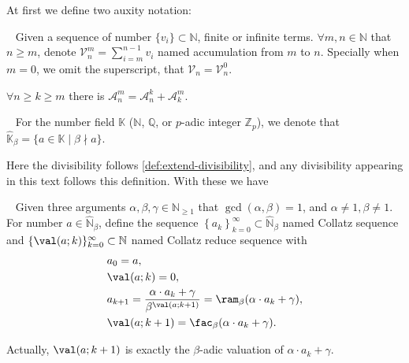 At first we define two auxity notation:
\begin{definition}~\label{def:collatz-accumulation}
    Given a sequence of number $\{v_{i}\}\subset\mathbb{N}$, finite or infinite terms. $\forall m, n \in \mathbb{N}$ that $n \ge m$, denote $\mathcal{V}_{n}^{m} = \sum_{i=m}^{n-1}v_{i}$ named accumulation from $m$ to $n$.
    Specially when $m = 0$, we omit the superscript, that $\mathcal{V}_n = \mathcal{V}_n^{0}$.
\end{definition}
\begin{proposition}
    $\forall n \ge k \ge m$ there is $\mathcal{A}_n^m = \mathcal{A}_n^{k} + \mathcal{A}_k^{m}$.
\end{proposition}
\begin{definition}~\label{def:exclude-beta-times}
    For the number field $\mathbb{K}$ ($\mathbb{N}$, $\mathbb{Q}$, or $p$-adic integer $\mathbb{Z}_{p}$), we denote that $\widehat{\mathbb{K}}_{{\beta}} = \{a \in\mathbb{K} \mid \beta \nmid a\}$.
 \end{definition}
Here the divisibility follows \cref{def:extend-divisibility}, and any divisibility appearing in this text follows this definition.
With these we have
\begin{definition}~\label{definition:collatz-sequence}
    Given three arguments $\alpha, \beta, \gamma \in \mathbb{N}_{\ge1}$ that $\gcd(\alpha, \beta) = 1$, and $\alpha \ne 1, \beta\ne 1$.\newline
    For number $a \in \widehat{\mathbb{N}}_{{\beta}}$, define the sequence $\left\{a_{k}\right\}_{k = 0}^{\infty} \subset \widehat{\mathbb{N}}_{{\beta}}$ named Collatz sequence and $\{\val(a;k)\}_{k=0}^{\infty}\subset\mathbb{N}$ named Collatz reduce sequence with
    \begin{align*}
        &a_0=a, \\
        &\val(a;k) = 0, \\
        &a_{k+1} = \frac{\alpha\cdot a_{k} + \gamma}{\beta^{\val(a;k + 1)}} = \ram_{\beta}(\alpha\cdot a_{k} + \gamma), \\
        &\val(a;k+1) = \fac_{\beta}(\alpha\cdot a_k + \gamma).
    \end{align*}
\end{definition}
Actually, $\val(a;k+1)$ is exactly the $\beta$-adic valuation of $\alpha\cdot a_{k} + \gamma$.

